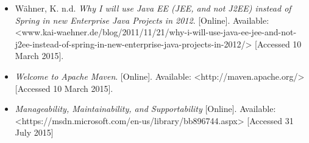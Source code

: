 \documentclass[a4paper,12pt]{article}
\begin{document}
\begin{itemize}
			\item Wähner, K. n.d. \textit{Why I will use Java EE (JEE, and not J2EE) instead of Spring in new Enterprise Java Projects in 2012}. [Online]. Available: <www.kai-waehner.de/blog/2011/11/21/why-i-will-use-java-ee-jee-and-not-j2ee-instead-of-spring-in-new-enterprise-java-projects-in-2012/> [Accessed 10 March 2015].		

			\item \textit{Welcome to Apache Maven}. [Online]. Available: <http://maven.apache.org/> [Accessed 10 March 2015].
			
			\item \textit{Manageability, Maintainability, and Supportability} [Online]. Available: <https://msdn.microsoft.com/en-us/library/bb896744.aspx> [Accessed 31 July 2015]
			
			

			

		\end{itemize}
\end{document}
